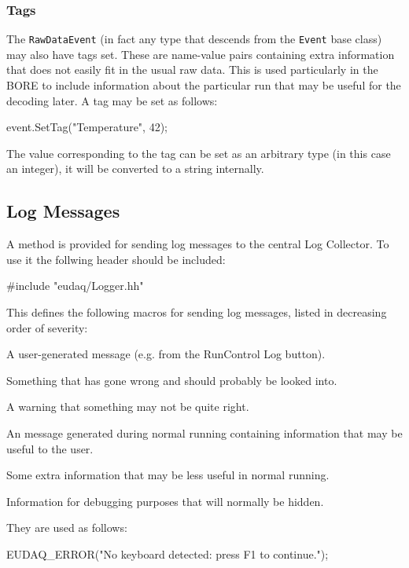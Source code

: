 \subsubsection{Tags}\label{sec:Tags}
The \texttt{RawDataEvent} (in fact any type that descends from the \texttt{Event} base class)
may also have tags set.
These are name-value pairs containing extra information that does not easily fit
in the usual raw data.
This is used particularly in the \gls{BORE} to include information about the particular run
that may be useful for the decoding later.
A tag may be set as follows:
\begin{listing}
event.SetTag("Temperature", 42);
\end{listing}

The value corresponding to the tag can be set as an arbitrary type (in this case an integer),
it will be converted to a string internally.

\subsection{Log Messages}
A method is provided for sending log messages to the central Log Collector.
To use it the follwing header should be included:
\begin{listing}
#include "eudaq/Logger.hh"
\end{listing}

This defines the following macros for sending log messages,
listed in decreasing order of severity:
\begin{description}

A user-generated message (e.g. from the RunControl Log button).

Something that has gone wrong and should probably be looked into.

A warning that something may not be quite right.

An message generated during normal running containing information that may be useful to the user.

Some extra information that may be less useful in normal running.

Information for debugging purposes that will normally be hidden.

\end{description}

They are used as follows:
\begin{listing}
EUDAQ_ERROR("No keyboard detected: press F1 to continue.");
\end{listing}

